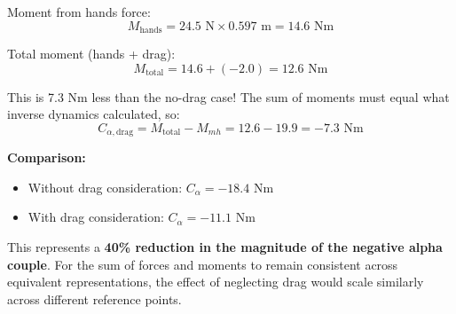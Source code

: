 \documentclass[11pt,a4paper]{article}
\theoremstyle{definition}
\theoremstyle{plain}
\begin{document}
Moment from hands force:
\begin{equation}
M_{\text{hands}} = 24.5 \text{ N} \times 0.597 \text{ m} = 14.6 \text{ Nm}
\end{equation}

Total moment (hands + drag):
\begin{equation}
M_{\text{total}} = 14.6 + (-2.0) = 12.6 \text{ Nm}
\end{equation}

This is 7.3 Nm less than the no-drag case! The sum of moments must equal what inverse dynamics calculated, so:
\begin{equation}
C_{\alpha,\text{drag}} = M_{\text{total}} - M_{mh} = 12.6 - 19.9 = -7.3 \text{ Nm}
\end{equation}

\textbf{Comparison:}
\begin{itemize}
    \item Without drag consideration: $C_\alpha = -18.4$ Nm
    \item With drag consideration: $C_\alpha = -11.1$ Nm
\end{itemize}

This represents a \textbf{40\% reduction in the magnitude of the negative alpha couple}. For the sum of forces and moments to remain consistent across equivalent representations, the effect of neglecting drag would scale similarly across different reference points.
\end{document}
